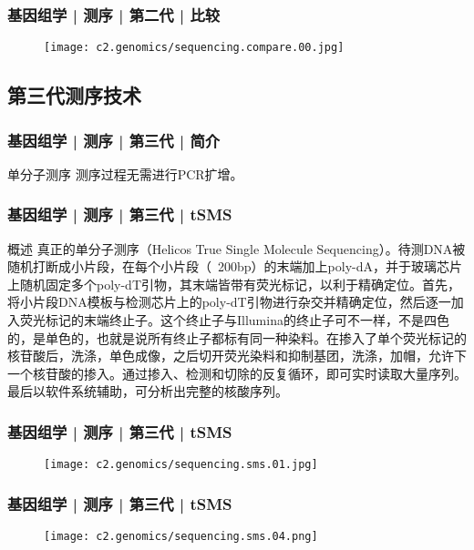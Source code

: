 \begin{frame}
  \frametitle{基因组学 | 测序 | 第二代 | 比较}
  \begin{figure}
    \centering
    \texttt{[image: c2.genomics/sequencing.compare.00.jpg]}
  \end{figure}
\end{frame}

\subsection{第三代测序技术}
\begin{frame}
  \frametitle{基因组学 | 测序 | 第三代 | 简介}
  \begin{block}{单分子测序}
测序过程无需进行PCR扩增。 
  \end{block}
\end{frame}

\begin{frame}
  \frametitle{基因组学 | 测序 | 第三代 | tSMS}
  \begin{block}{概述}
真正的单分子测序（Helicos True Single Molecule Sequencing）。待测DNA被随机打断成小片段，在每个小片段（~200bp）的末端加上poly-dA，并于玻璃芯片上随机固定多个poly-dT引物，其末端皆带有荧光标记，以利于精确定位。首先，将小片段DNA模板与检测芯片上的poly-dT引物进行杂交并精确定位，然后逐一加入荧光标记的末端终止子。这个终止子与Illumina的终止子可不一样，不是四色的，是单色的，也就是说所有终止子都标有同一种染料。在掺入了单个荧光标记的核苷酸后，洗涤，单色成像，之后切开荧光染料和抑制基团，洗涤，加帽，允许下一个核苷酸的掺入。通过掺入、检测和切除的反复循环，即可实时读取大量序列。最后以软件系统辅助，可分析出完整的核酸序列。
  \end{block}
\end{frame}

\begin{frame}
  \frametitle{基因组学 | 测序 | 第三代 | tSMS}
  \begin{figure}
    \centering
    \texttt{[image: c2.genomics/sequencing.sms.01.jpg]}
  \end{figure}
\end{frame}

\begin{frame}
  \frametitle{基因组学 | 测序 | 第三代 | tSMS}
  \begin{figure}
    \centering
    \texttt{[image: c2.genomics/sequencing.sms.04.png]}
  \end{figure}
\end{frame}

